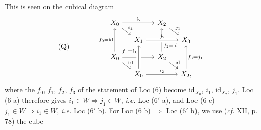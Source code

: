 \documentclass[11pt]{article}
\newcommand{\id}{\mathrm{id}}
\begin{document}
This is seen on the cubical diagram
\[
\text{(Q)}\qquad\qquad
\begin{tikzcd}[row sep=small,column sep=small]
X_0 \arrow[rr,"i_2"] \arrow[dr,"i_1"] & & X_2 \arrow[dr,"j_1"] \arrow[from=dd,"f_2=\id"' near start] & \\
& X_1 \arrow[rr,"j_2",crossing over] & & X_3 \\
X_0 \arrow[uu,"f_0=\id"] \arrow[rr,"i_2"] \arrow[dr,"\id"] & & X_2 \arrow[dr,"\id"] & \\
& X_0 \arrow[rr,"i_2"] \arrow[uu,crossing over,"f_1=i_1" near end] & & X_2, \arrow[uu,"f_3=j_1"']
\end{tikzcd}
\]
where the $f_0$, $f_1$, $f_2$, $f_3$ of the statement of Loc (6) become $\id_{X_0}$, $i_1$, $\id_{X_2}$, $j_1$. Loc (6 a) therefore gives $i_1\in W\Longrightarrow j_1\in W$, \textit{i.e.} Loc (6$'$ a), and Loc (6 c) $j_1\in W\Longrightarrow i_1\in W$, \textit{i.e.} Loc (6$'$ b). For Loc (6 b) $\Longrightarrow$ Loc (6$'$ b), we use (\textit{cf.} XII, p. 78) the cube
\end{document}
